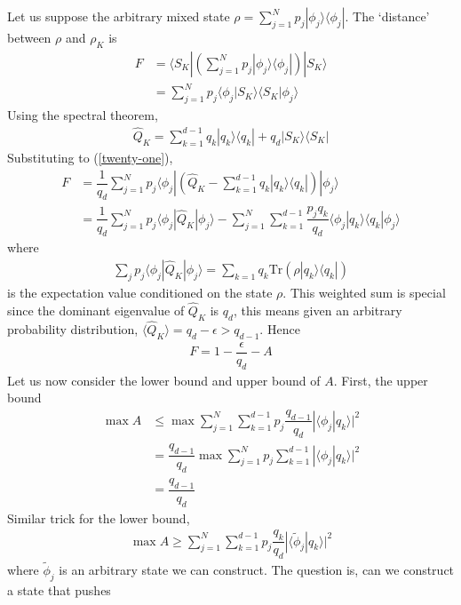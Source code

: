 \documentclass[%
 reprint,
superscriptaddress,
 amsmath,amssymb,
 aps,13pt
]{revtex4-2}
\begin{document}
Let us suppose the arbitrary mixed state $\rho=\sum_{j=1}^N p_j|\phi_j\rangle\langle\phi_j|$. The `distance' between $\rho$ and $\rho_K$ is
\begin{align}
    F &= \langle S_K|\left(\sum_{j=1}^N p_j|\phi_j\rangle\langle\phi_j|\right)|S_K\rangle\\
    &= \sum_{j=1}^N p_j \langle\phi_j|S_K\rangle\langle S_K |\phi_j\rangle\label{twenty-one}
\end{align}
Using the spectral theorem,
\begin{align}
    \hat{Q}_K=\sum_{k=1}^{d-1}q_k|q_k\rangle\langle q_k|+q_d|S_K\rangle\langle S_K|
\end{align}
Substituting to (\ref{twenty-one}),
\begin{align}
    F &= \dfrac{1}{q_d}\sum_{j=1}^N p_j \langle\phi_j|\left(\hat{Q}_K-\sum_{k=1}^{d-1}q_k|q_k\rangle\langle q_k|\right)|\phi_j\rangle\\
    &=\dfrac{1}{q_d}\sum_{j=1}^N p_j \langle\phi_j|\hat{Q}_K|\phi_j\rangle -\sum_{j=1}^{N}\sum_{k=1}^{d-1}\dfrac{p_j q_k}{q_d}\langle\phi_j|q_k\rangle\langle q_k|\phi_j\rangle
\end{align}
where
\begin{align}
    \sum_{j}p_j\langle \phi_j|\hat{Q}_K|\phi_j\rangle=\sum_{k=1} q_k \text{Tr}\left(\rho |q_k\rangle \langle q_k|\right)
\end{align} 
is the expectation value conditioned on the state $\rho$. This weighted sum is special since the dominant eigenvalue of $\hat{Q}_K$ is $q_d$, this means given an arbitrary probability distribution, $\langle \hat{Q}_K\rangle = q_d-\epsilon > q_{d-1}$. Hence 
\begin{align}
    F = 1 - \dfrac{\epsilon}{q_d} - A
\end{align}
Let us now consider the lower bound and upper bound of $A$. First, the upper bound
\begin{align}
\max A &\leq \max \sum_{j=1}^N\sum_{k=1}^{d-1} p_j\dfrac{q_{d-1}}{q_d} |\langle\phi_j|q_k\rangle|^2\\
&= \dfrac{q_{d-1}}{q_d}\max \sum_{j=1}^N p_j \sum_{k=1}^{d-1} |\langle\phi_j|q_k\rangle|^2\\
&= \dfrac{q_{d-1}}{q_d}
\end{align}
Similar trick for the lower bound,
\begin{align}
\max A \geq \sum_{j=1}^N\sum_{k=1}^{d-1} p_j \dfrac{q_k}{q_d} |\langle\tilde{\phi}_j|q_k\rangle|^2
\end{align}
where $\tilde{\phi}_j$ is an arbitrary state we can construct. The question is, can we construct a state that pushes
\end{document}
